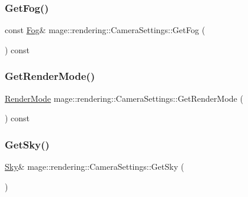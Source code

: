 \hypertarget{classmage_1_1rendering_1_1_camera_settings_acd360516b025b09c2ac668f48d6259c7}{}\label{classmage_1_1rendering_1_1_camera_settings_acd360516b025b09c2ac668f48d6259c7} 
\subsubsection{\texorpdfstring{Get\+Fog()}{GetFog()}\hspace{0.1cm}{\footnotesize\ttfamily [2/2]}}
{\footnotesize\ttfamily const \hyperlink{classmage_1_1rendering_1_1_fog}{Fog}\& mage\+::rendering\+::\+Camera\+Settings\+::\+Get\+Fog (\begin{DoxyParamCaption}{ }\end{DoxyParamCaption}) const\hspace{0.3cm}{\ttfamily [noexcept]}}

\hypertarget{classmage_1_1rendering_1_1_camera_settings_ab1421b9c47b7eafbebd0619c5b5116b5}{}\label{classmage_1_1rendering_1_1_camera_settings_ab1421b9c47b7eafbebd0619c5b5116b5} 
\subsubsection{\texorpdfstring{Get\+Render\+Mode()}{GetRenderMode()}}
{\footnotesize\ttfamily \hyperlink{namespacemage_1_1rendering_aeb14ce7610cc9391f4e01be027b91dcc}{Render\+Mode} mage\+::rendering\+::\+Camera\+Settings\+::\+Get\+Render\+Mode (\begin{DoxyParamCaption}{ }\end{DoxyParamCaption}) const\hspace{0.3cm}{\ttfamily [noexcept]}}

\hypertarget{classmage_1_1rendering_1_1_camera_settings_a3538572fc79fa03380cb9ed8cceeba42}{}\label{classmage_1_1rendering_1_1_camera_settings_a3538572fc79fa03380cb9ed8cceeba42} 
\subsubsection{\texorpdfstring{Get\+Sky()}{GetSky()}\hspace{0.1cm}{\footnotesize\ttfamily [1/2]}}
{\footnotesize\ttfamily \hyperlink{classmage_1_1rendering_1_1_sky}{Sky}\& mage\+::rendering\+::\+Camera\+Settings\+::\+Get\+Sky (\begin{DoxyParamCaption}{ }\end{DoxyParamCaption})\hspace{0.3cm}{\ttfamily [noexcept]}}

